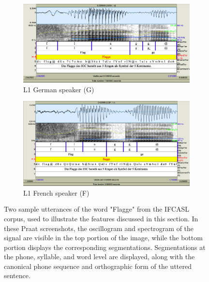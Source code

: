 	\begin{figure}
		\centering
		
		 \begin{subfigure}{\textwidth}
                \includegraphics[width=\textwidth]{img/screenshots/2SH05_GGMB2_035-flagge}
                \caption{L1 German speaker (G)}
                \label{fig:featuresexample:gg}
        \end{subfigure}%
        
        \vspace{1.5em}

        
		\begin{subfigure}{\textwidth}
                \includegraphics[width=\textwidth]{img/screenshots/2SH05_FGMA2_526-flagge}
                \caption{L1 French speaker (F)}
                \label{fig:featuresexample:fg}
        \end{subfigure}%
        
        \vspace{1.5em}

		\caption[Sample L1 and L2 word utterances]{Two sample utterances of the word "Flagge" from the IFCASL corpus, used to illustrate the features discussed in this section. In these Praat screenshots, the oscillogram and spectrogram of the signal are visible in the top portion of the image, while the bottom portion displays the corresponding segmentations. Segmentations at the phone, syllable, and word level are displayed, along with the canonical phone sequence and orthographic form of the uttered sentence.}
		\label{fig:featuresexample}
	\end{figure}
	
